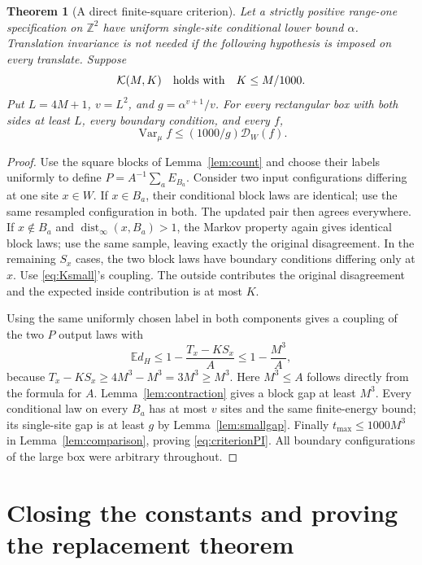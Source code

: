 \documentclass[11pt]{amsart}
\newtheorem{theorem}{Theorem}[section]
\theoremstyle{definition}
\newcommand{\Z}{\mathbb Z}
\newcommand{\E}{\mathbb E}
\newcommand{\Var}{\operatorname{Var}}
\newcommand{\dist}{\operatorname{dist}_\infty}
\newcommand{\cD}{\mathcal D}
\newcommand{\1}{\mathbf 1}
\begin{document}
\begin{theorem}[A direct finite-square criterion]
\label{thm:criterion}
Let a strictly positive range-one specification on $\Z^2$ have uniform
single-site conditional lower bound $\alpha$. Translation invariance is
not needed if the following hypothesis is imposed on every translate.
Suppose
\begin{equation}\label{eq:Ksmall}
 \mathcal K(M,K)\quad\hbox{holds with}\quad K\le M/1000.
\end{equation}
Put $L=4M+1$, $v=L^2$, and $g=\alpha^{v+1}/v$.
For every rectangular box with both sides at least $L$, every boundary
condition, and every $f$,
\begin{equation}\label{eq:criterionPI}
 \Var_\mu f\le(1000/g)\cD_W(f).
\end{equation}
\end{theorem}
\begin{proof}
Use the square blocks of Lemma~\ref{lem:count} and choose their labels
uniformly to define $P=A^{-1}\sum_a E_{B_a}$. Consider two input
configurations differing at one site $x\in W$. If $x\in B_a$, their
conditional block laws are identical; use the same resampled configuration
in both. The updated pair then agrees everywhere. If $x\notin B_a$ and
$\dist(x,B_a)>1$, the Markov property again gives identical block laws;
use the same sample, leaving exactly the original disagreement. In the
remaining $S_x$ cases, the two block laws have boundary conditions
differing only at $x$. Use \eqref{eq:Ksmall}'s coupling. The outside
contributes the original disagreement and the expected inside
contribution is at most $K$.

Using the same uniformly chosen label in both components gives a coupling
of the two $P$ output laws with
\[
 \E d_H\le1-\frac{T_x-KS_x}{A}
 \le1-\frac{M^3}{A},
\]
because $T_x-KS_x\ge4M^3-M^3=3M^3\ge M^3$.
Here $M^3\le A$ follows directly from the formula for $A$.
Lemma~\ref{lem:contraction} gives a block gap at least $M^3$.
Every conditional law on every $B_a$ has at most $v$ sites and the same
finite-energy bound; its single-site gap is at least $g$ by
Lemma~\ref{lem:smallgap}. Finally $t_{\max}\le1000M^3$ in
Lemma~\ref{lem:comparison}, proving \eqref{eq:criterionPI}.
All boundary configurations of the large box were arbitrary throughout.
\end{proof}

\section{Closing the constants and proving the replacement theorem}
\label{sec:scale}
\end{document}
